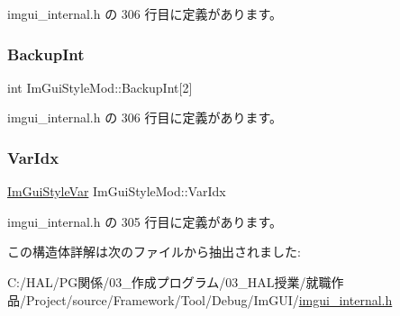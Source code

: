  imgui\+\_\+internal.\+h の 306 行目に定義があります。

\mbox{\label{struct_im_gui_style_mod_a60491c95989b2a866ebb76403a562f6f}} 
\subsubsection{\texorpdfstring{Backup\+Int}{BackupInt}}
{\footnotesize\ttfamily int Im\+Gui\+Style\+Mod\+::\+Backup\+Int\mbox{[}2\mbox{]}}



 imgui\+\_\+internal.\+h の 306 行目に定義があります。

\mbox{\label{struct_im_gui_style_mod_ab23c55941dbd0e156ce640a8fecb2feb}} 
\subsubsection{\texorpdfstring{Var\+Idx}{VarIdx}}
{\footnotesize\ttfamily \mbox{\hyperlink{imgui_8h_ac919acabce24faae590e295b424874ca}{Im\+Gui\+Style\+Var}} Im\+Gui\+Style\+Mod\+::\+Var\+Idx}



 imgui\+\_\+internal.\+h の 305 行目に定義があります。



この構造体詳解は次のファイルから抽出されました\+:\begin{DoxyCompactItemize}
\item 
C\+:/\+H\+A\+L/\+P\+G関係/03\+\_\+作成プログラム/03\+\_\+\+H\+A\+L授業/就職作品/\+Project/source/\+Framework/\+Tool/\+Debug/\+Im\+G\+U\+I/\mbox{\hyperlink{imgui__internal_8h}{imgui\+\_\+internal.\+h}}\end{DoxyCompactItemize}
